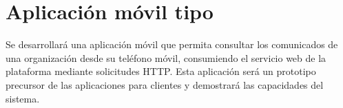 \section{Aplicación móvil tipo}
Se desarrollará una aplicación móvil que permita consultar los comunicados de una organización desde su teléfono móvil, consumiendo el servicio web de la plataforma mediante solicitudes HTTP. Esta aplicación será un prototipo precursor de las aplicaciones para clientes y demostrará las capacidades del sistema.